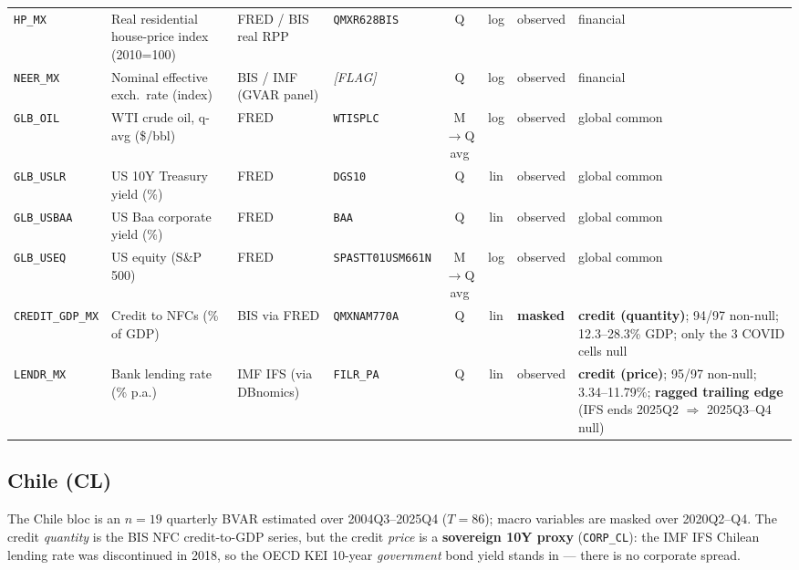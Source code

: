 {\begin{longtable}{@{}llp{2.5cm}p{2.4cm}cclp{2.6cm}@{}}
\texttt{HP\_MX}   & Real residential house-price index (2010=100) & FRED / BIS real RPP & \texttt{QMXR628BIS} & Q & log & observed & financial \\
\texttt{NEER\_MX} & Nominal effective exch.\ rate (index) & BIS / IMF (GVAR panel) & \textit{[FLAG]} & Q & log & observed & financial \\
\texttt{GLB\_OIL} & WTI crude oil, q-avg (\$/bbl) & FRED & \texttt{WTISPLC} & M$\to$Q avg & log & observed & global common \\
\texttt{GLB\_USLR} & US 10Y Treasury yield (\%) & FRED & \texttt{DGS10} & Q & lin & observed & global common \\
\texttt{GLB\_USBAA} & US Baa corporate yield (\%) & FRED & \texttt{BAA} & Q & lin & observed & global common \\
\texttt{GLB\_USEQ} & US equity (S\&P 500) & FRED & \texttt{SPASTT01USM661N} & M$\to$Q avg & log & observed & global common \\
\texttt{CREDIT\_GDP\_MX} & Credit to NFCs (\% of GDP) & BIS via FRED & \texttt{QMXNAM770A} & Q & lin & \textbf{masked} & \textbf{credit (quantity)}; 94/97 non-null; 12.3--28.3\% GDP; only the 3 COVID cells null \\
\texttt{LENDR\_MX} & Bank lending rate (\% p.a.) & IMF IFS (via DBnomics) & \texttt{FILR\_PA} & Q & lin & observed & \textbf{credit (price)}; 95/97 non-null; 3.34--11.79\%; \textbf{ragged trailing edge} (IFS ends 2025Q2 $\Rightarrow$ 2025Q3--Q4 null) \\
\end{longtable}}

\subsection{Chile (CL)}\label{sec:data:CL}

The Chile bloc is an $n=19$ quarterly BVAR estimated over 2004Q3--2025Q4
($T=86$); macro variables are masked over 2020Q2--Q4. The credit \emph{quantity}
is the BIS NFC credit-to-GDP series, but the credit \emph{price} is a
\textbf{sovereign 10Y proxy} (\texttt{CORP\_CL}): the IMF IFS Chilean lending
rate was discontinued in 2018, so the OECD KEI 10-year \emph{government} bond
yield stands in --- there is no corporate spread.

